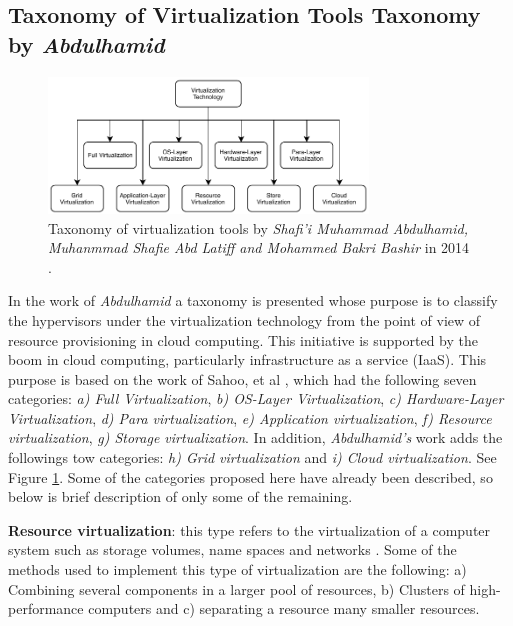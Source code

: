 	\subsection{Taxonomy of Virtualization Tools Taxonomy by \textit{Abdulhamid}}
	
	\begin{figure}[H]
		\centering
		\includegraphics[width=8.5cm]{images/Abdulhamid2014.pdf}
		\vspace{-0.2cm}
		\caption{Taxonomy of virtualization tools by \textit{Shafi'i Muhammad Abdulhamid, Muhanmmad Shafie Abd Latiff and Mohammed Bakri Bashir} in 2014 \cite{Abdulhamid2014}.}
		\label{fig:TaxonomyByAbdulhamid}
	\end{figure}
	
	In the work of \textit{Abdulhamid} \cite{Abdulhamid2014} a taxonomy is presented whose purpose is to classify the hypervisors under the virtualization technology from the point of view of resource provisioning in cloud computing. This initiative is supported by the boom in cloud computing, particularly infrastructure as a service (IaaS). This purpose is based on the work of Sahoo, et al \cite{Sahoo2010}, which had the following seven categories: \textit{a) Full Virtualization}, \textit{b) OS-Layer Virtualization}, \textit{c) Hardware-Layer Virtualization}, \textit{d) Para virtualization}, \textit{e) Application virtualization}, \textit{f) Resource virtualization}, \textit{g) Storage virtualization}. In addition, \textit{Abdulhamid's} work adds the followings tow categories: \textit{h) Grid virtualization} and \textit{i) Cloud virtualization}. See Figure \ref{fig:TaxonomyByAbdulhamid}. Some of the categories proposed here have already been described, so below is brief description of only some of the remaining. 
	
	\textbf{Resource virtualization}: this type refers to the virtualization of a computer system such as storage volumes, name spaces and networks \cite{Abdulhamid2014}.	Some of the methods used to implement this type of virtualization are the following: a) Combining several components in a larger pool of resources, b) Clusters of high-performance computers and c) separating a resource many smaller resources.
	
